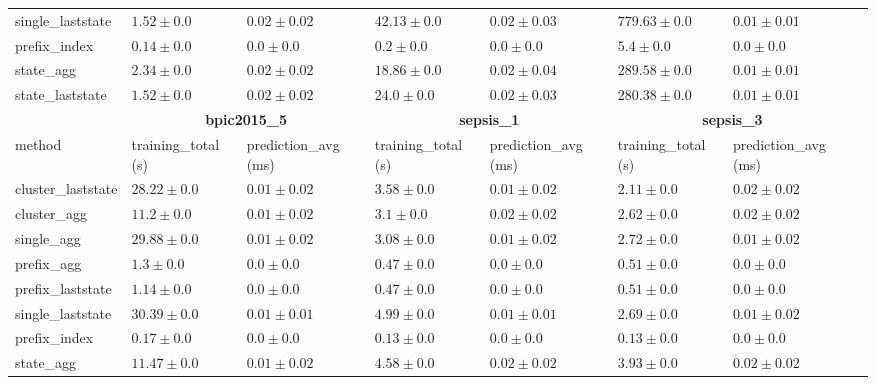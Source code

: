 \documentclass[twoside,11pt]{Latex/Classes/PhDthesisPSnPDF}
\begin{document}
\begin{table}[!htbp]
{\begin{tabular}{llllllll}
			single\_laststate & $1.52 \pm 0.0$ & $0.02 \pm 0.02$ & $42.13 \pm 0.0$ & $0.02 \pm 0.03$ & $779.63 \pm 0.0$ & $0.01 \pm 0.01$ \\ 
			prefix\_index & $\mathbf{0.14 \pm 0.0}$ & $\mathbf{0.0 \pm 0.0}$ & $\mathbf{0.2 \pm 0.0}$ & $\mathbf{0.0 \pm 0.0}$ & $\mathbf{5.4 \pm 0.0}$ & $\mathbf{0.0 \pm 0.0}$ \\ 
			state\_agg & $2.34 \pm 0.0$ & $0.02 \pm 0.02$ & $18.86 \pm 0.0$ & $0.02 \pm 0.04$ & $289.58 \pm 0.0$ & $0.01 \pm 0.01$ \\ 
			state\_laststate & $1.52 \pm 0.0$ & $0.02 \pm 0.02$ & $24.0 \pm 0.0$ & $0.02 \pm 0.03$ & $280.38 \pm 0.0$ & $0.01 \pm 0.01$ \\ 
			\bottomrule
			\toprule
			& \multicolumn{2}{c}{{\bfseries bpic2015\_5}} & \multicolumn{2}{c}{{\bfseries sepsis\_1}} & \multicolumn{2}{c}{{\bfseries sepsis\_3}} \\ \cmidrule(lr){2-3} \cmidrule(lr){4-5} \cmidrule(lr){6-7}
			method  & training\_total (s) & prediction\_avg (ms) & training\_total (s) & prediction\_avg (ms) & training\_total (s) & prediction\_avg (ms) \\ \midrule
			cluster\_laststate & $28.22 \pm 0.0$ & $0.01 \pm 0.02$ & $3.58 \pm 0.0$ & $0.01 \pm 0.02$ & $2.11 \pm 0.0$ & $0.02 \pm 0.02$ \\ 
			cluster\_agg & $11.2 \pm 0.0$ & $0.01 \pm 0.02$ & $3.1 \pm 0.0$ & $0.02 \pm 0.02$ & $2.62 \pm 0.0$ & $0.02 \pm 0.02$ \\ 
			single\_agg & $29.88 \pm 0.0$ & $0.01 \pm 0.02$ & $3.08 \pm 0.0$ & $0.01 \pm 0.02$ & $2.72 \pm 0.0$ & $0.01 \pm 0.02$ \\ 
			prefix\_agg & $1.3 \pm 0.0$ & $\mathbf{0.0 \pm 0.0}$ & $0.47 \pm 0.0$ & $\mathbf{0.0 \pm 0.0}$ & $0.51 \pm 0.0$ & $\mathbf{0.0 \pm 0.0}$ \\ 
			prefix\_laststate & $1.14 \pm 0.0$ & $\mathbf{0.0 \pm 0.0}$ & $0.47 \pm 0.0$ & $\mathbf{0.0 \pm 0.0}$ & $0.51 \pm 0.0$ & $\mathbf{0.0 \pm 0.0}$ \\ 
			single\_laststate & $30.39 \pm 0.0$ & $0.01 \pm 0.01$ & $4.99 \pm 0.0$ & $0.01 \pm 0.01$ & $2.69 \pm 0.0$ & $0.01 \pm 0.02$ \\ 
			prefix\_index & $\mathbf{0.17 \pm 0.0}$ & $\mathbf{0.0 \pm 0.0}$ & $\mathbf{0.13 \pm 0.0}$ & $\mathbf{0.0 \pm 0.0}$ & $\mathbf{0.13 \pm 0.0}$ & $\mathbf{0.0 \pm 0.0}$ \\ 
			state\_agg & $11.47 \pm 0.0$ & $0.01 \pm 0.02$ & $4.58 \pm 0.0$ & $0.02 \pm 0.02$ & $3.93 \pm 0.0$ & $0.02 \pm 0.02$ \\ 

\end{tabular}}
\end{table}
\end{document}

